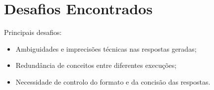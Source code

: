 \section{Desafios Encontrados}

Principais desafios:
\begin{itemize}

\item Ambiguidades e imprecisões técnicas nas respostas geradas;
\item Redundância de conceitos entre diferentes execuções;
\item Necessidade de controlo do formato e da concisão das respostas.
\end{itemize}
